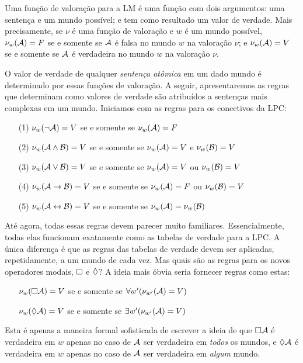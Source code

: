 Uma função de valoração para a LM é uma função com dois argumentos:  uma sentença  e um mundo  possível;  e tem como resultado um valor de verdade.   
Mais precisamente, se $\nu$   é uma função de valoração  e $w$ é um mundo possível,   $\nu_w(\mathcal{A})=F$  se e somente se $\mathcal{A}$ é falsa no mundo $w$ na valoração $\nu$; e $\nu_w(\mathcal{A})=V$  se e somente se $\mathcal{A}$  é verdadeira no mundo $w$ na valoração $\nu$.

O valor de verdade de  qualquer \emph{sentença atômica} em um dado mundo é determinado por essas funções de valoração.  A seguir, apresentaremos as  regras   que determinam como valores de verdade são atribuídos a sentenças mais complexas em um mundo. Iniciamos com  as regras para os conectivos da  LPC:

\begin{itemize}
	\item[(1)]$\nu_w(\neg\mathcal{A})=V$ se e somente se $\nu_w(\mathcal{A})=F$
	\item[(2)]$\nu_w(\mathcal{A}\wedge\mathcal{B})=V$ se e somente se $\nu_w(\mathcal{A})=V$ e $\nu_w(\mathcal{B})=V$
	\item[(3)]$\nu_w(\mathcal{A}\vee\mathcal{B})=V$ se e somente se $\nu_w(\mathcal{A})=V$ ou $\nu_w(\mathcal{B})=V$
	\item[(4)]$\nu_w(\mathcal{A}\rightarrow\mathcal{B})=V$ se e somente se $\nu_w(\mathcal{A})=F$ ou $\nu_w(\mathcal{B})=V$
	\item[(5)]$\nu_w(\mathcal{A}\leftrightarrow\mathcal{B})=V$ se e somente se $\nu_w(\mathcal{A})=\nu_w(\mathcal{B})$  
\end{itemize}
 

Até agora, todas essas regras devem parecer muito familiares. Essencialmente, todas elas funcionam exatamente como as tabelas de verdade para a LPC. A única diferença é que as regras das tabelas de verdade devem ser aplicadas, repetidamente, a um mundo de cada vez.
Mas quais são as regras para os novos operadores modais, $\Box$ e $\Diamond$? A ideia mais óbvia seria fornecer regras como estas:
\begin{itemize}
	\item[]$\nu_w(\Box \mathcal{A})=V$ se e somente se $\forall w' (\nu_{w'}(\mathcal{A})=V)$
	\item[]$\nu_w(\Diamond \mathcal{A})=V $ se e somente se $\exists w' (\nu_{w'}(\mathcal{A})=V)$
\end{itemize}
Esta é apenas a maneira formal sofisticada de escrever a ideia de que $\Box\mathcal{A}$ é verdadeira em $w$ apenas no caso de $\mathcal{A}$ ser verdadeira em \emph{todos} os mundos, e $\Diamond\mathcal{A}$ é verdadeira em $w$ apenas no caso de $\mathcal{A}$ ser verdadeira em \emph{algum} mundo.

